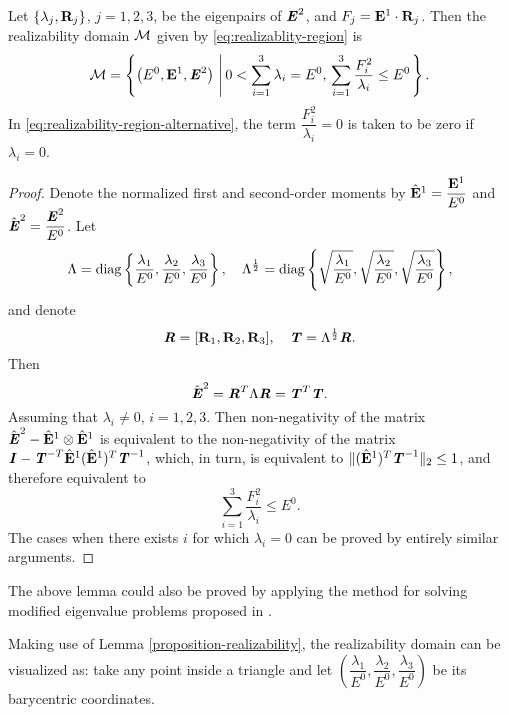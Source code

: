 \begin{lemma}\label{proposition-realizability}
  Let $\{\lambda_j,\mathbf{R}_j\}$, $j=1,2,3$, be the eigenpairs of
  $\boldsymbol{\mathit{E}}^2$, and $F_j = \mathbf{E}^1\cdot\mathbf{R}_j$. Then the realizability domain ${\mathcal M}$
  given by \eqref{eq:realizablity-region} is
  \begin{equation}\label{eq:realizability-region-alternative}
    \cM = \left\{ \left(E^0, \bE^1, \bbrE^2\right) \, \left| \,
      0 < \sum\limits_{i=1}^3 \lambda_i = E^0,\, 
      \sum\limits_{i=1}^3 \dfrac{F_i^2}{\lambda_i} \leq
    E^0 \right.\right\}.
  \end{equation}
  In \eqref{eq:realizability-region-alternative},
the term $\dfrac{F_i^2}{\lambda_i} = 0$ is taken to be zero if $\lambda_i = 0$.
\end{lemma}
\begin{proof}
Denote the normalized first and second-order moments by
$\hat{\mathbf{E}}^1 = \dfrac{\mathbf{E}^1}{E^0}$ and $\hat{\boldsymbol{\mathit{E}}}^2 = \dfrac{\boldsymbol{\mathit{E}}^2}{E^0}$.
Let
\[
  \Lambda = \operatorname{diag}\left\{\dfrac{\lambda_1}{E^0}, \dfrac{\lambda_2}{E^0}, 
  \dfrac{\lambda_3}{E^0}\right\}, \quad
  \Lambda^{\frac12} = \operatorname{diag}\left\{\sqrt{\dfrac{\lambda_1}{E^0}}, \sqrt{\dfrac{\lambda_2}{E^0}}, 
  \sqrt{\dfrac{\lambda_3}{E^0}} \right\},
\]
and denote
\[
  \boldsymbol{\mathit{R}} = [\mathbf{R}_1, \mathbf{R}_2, \mathbf{R}_3], \quad \boldsymbol{\mathit{T}} = \Lambda^{\frac12} \boldsymbol{\mathit{R}}.
\]
Then
\[
  \hat{\boldsymbol{\mathit{E}}}^2 = \boldsymbol{\mathit{R}}^T \Lambda \boldsymbol{\mathit{R}} = \boldsymbol{\mathit{T}}^T \boldsymbol{\mathit{T}}. 
\]
Assuming that $\lambda_i \not= 0$, $i = 1,2,3$. Then non-negativity of the matrix 
$\hat{\boldsymbol{\mathit{E}}}^2 - \hat{\mathbf{E}}^1 \otimes \hat{\mathbf{E}}^1$
is equivalent to the non-negativity of the matrix $
  \boldsymbol{\mathit{I}} - \boldsymbol{\mathit{T}}^{-T} \hat{\mathbf{E}}^1 (\hat{\mathbf{E}}^1)^T \boldsymbol{\mathit{T}}^{-1}$,
which, in turn, is equivalent to 
$\|(\hat{\mathbf{E}}^1)^T \boldsymbol{\mathit{T}}^{-1}\|_2 \leq 1$, and therefore equivalent to
\begin{equation}\label{eq:realizable-cond}
  \sum\limits_{i = 1}^3 \dfrac{F_i^2}{\lambda_i} \leq E^0.
\end{equation}
The cases when there exists $i$ for which $\lambda_i = 0$ can be proved by entirely similar arguments.
\end{proof}
\begin{remark}
The above lemma could also be proved by applying the method for solving modified
eigenvalue problems proposed in \cite{yu1991recursive}. 
\end{remark}
Making use of Lemma \ref{proposition-realizability},
the realizability domain can be visualized as: take any point inside 
a triangle and let $\left(\dfrac{\lambda_1}{E^0}, \dfrac{\lambda_2}{E^0},
\dfrac{\lambda_3}{E^0}\right)$ be its barycentric coordinates.  
